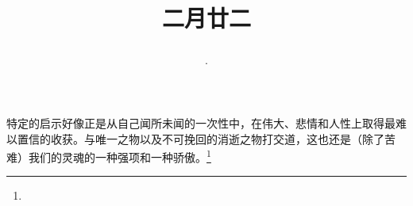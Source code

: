 \title{\date[d=31,m=3,y=2024][year:cn-y,年,month:cn,day:cn,日,·,weekday]·二月廿二 }
特定的启示好像正是从自己闻所未闻的一次性中，在伟大、悲情和人性上取得最难以置信的收获。与唯一之物以及不可挽回的消逝之物打交道，这也还是（除了苦难）我们的灵魂的一种强项和一种骄傲。\footnote{ }


